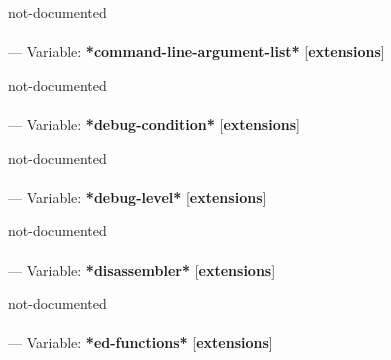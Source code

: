 \begin{adjustwidth}{5em}{5em}
not-documented
\end{adjustwidth}

\paragraph{}
\label{EXTENSIONS:*COMMAND-LINE-ARGUMENT-LIST*}
--- Variable: \textbf{*command-line-argument-list*} [\textbf{extensions}] \textit{}

\begin{adjustwidth}{5em}{5em}
not-documented
\end{adjustwidth}

\paragraph{}
\label{EXTENSIONS:*DEBUG-CONDITION*}
--- Variable: \textbf{*debug-condition*} [\textbf{extensions}] \textit{}

\begin{adjustwidth}{5em}{5em}
not-documented
\end{adjustwidth}

\paragraph{}
\label{EXTENSIONS:*DEBUG-LEVEL*}
--- Variable: \textbf{*debug-level*} [\textbf{extensions}] \textit{}

\begin{adjustwidth}{5em}{5em}
not-documented
\end{adjustwidth}

\paragraph{}
\label{EXTENSIONS:*DISASSEMBLER*}
--- Variable: \textbf{*disassembler*} [\textbf{extensions}] \textit{}

\begin{adjustwidth}{5em}{5em}
not-documented
\end{adjustwidth}

\paragraph{}
\label{EXTENSIONS:*ED-FUNCTIONS*}
--- Variable: \textbf{*ed-functions*} [\textbf{extensions}] \textit{}

